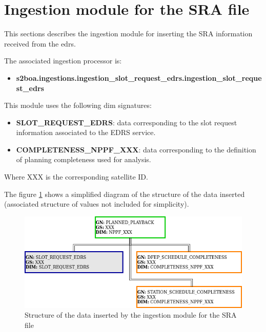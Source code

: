 \section{Ingestion module for the SRA file}

This sections describes the ingestion module for inserting the SRA information received from the \acrshort{edrs}.

The associated ingestion processor is:

\begin{itemize} 

\item \textbf{s2boa.ingestions.ingestion\_slot\_request\_edrs.ingestion\_slot\_request\_edrs}
  
\end{itemize}

This module uses the following \acrshort{dim} signatures:

\begin{itemize} 

\item \textbf{SLOT\_REQUEST\_EDRS}: data corresponding to the slot request information associated to the EDRS service.

\item \textbf{COMPLETENESS\_NPPF\_XXX}: data corresponding to the definition of planning completeness used for analysis.
  
\end{itemize}

Where XXX is the corresponding satellite ID.

The figure \ref{fg:structure_ingestion_slot_request_edrs} shows a simplified diagram of the structure of the data inserted (associated structure of values not included for simplicity).

\begin{figure}[H]
  \begin{center}
	\centering\includegraphics[width=150mm]{../fig/structure_ingestion_slot_request_edrs.png}
	\caption{Structure of the data inserted by the ingestion module for the SRA file}
	\label{fg:structure_ingestion_slot_request_edrs}
  \end{center}
\end{figure}

